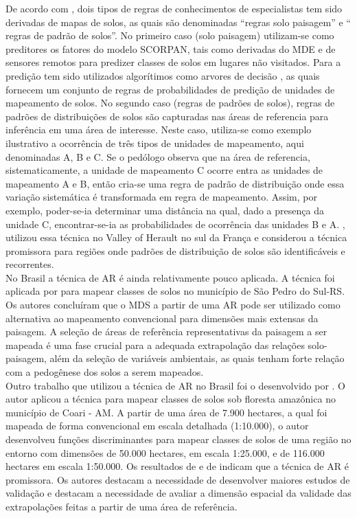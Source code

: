 De acordo com \cite{WalterEtAl:2007}, dois tipos de regras de conhecimentos de especialistas tem sido derivadas de mapas de solos, as quais são denominadas ``regras solo paisagem'' e `` regras de padrão de solos''. No primeiro caso (solo paisagem) utilizam-se como preditores os fatores do modelo SCORPAN, tais como derivadas do MDE e de sensores remotos para predizer classes de solos em lugares não visitados. Para a predição tem sido utilizados algorítimos como arvores de decisão \citep{Lagacherie:1992, LagacherieEtAl:1997, BuiEtAl:1999}, as quais fornecem um conjunto de regras de probabilidades de predição de unidades de mapeamento de solos.  No segundo caso (regras de padrões de solos), regras de padrões de distribuições de solos são capturadas nas áreas de referencia para inferência em uma área de interesse. Neste caso, utiliza-se como exemplo ilustrativo a ocorrência de três tipos de unidades de mapeamento, aqui denominadas A, B e C. Se o pedólogo observa
que na área de referencia, sistematicamente, a unidade de mapeamento C ocorre entra as unidades de mapeamento A e B, então cria-se uma regra de padrão de distribuição onde essa variação sistemática é transformada em regra de mapeamento. Assim, por exemplo, poder-se-ia determinar uma distância na qual, dado a presença da unidade C, encontrar-se-ia as probabilidades de ocorrência das unidades B e A. \cite{LagacherieEtAl:1995}, utilizou essa técnica no Valley of Herault no sul da França e considerou a técnica promissora para regiões onde padrões de distribuição de solos são identificáveis e recorrentes.\\
No Brasil a técnica de AR é ainda relativamente pouco aplicada. A técnica foi aplicada por \cite{TenCatenEtAl:2011} para mapear classes de solos no município de São Pedro do Sul-RS. Os autores concluíram que o MDS a partir de uma AR pode ser utilizado como alternativa ao mapeamento convencional para dimensões mais extensas da paisagem. A seleção de áreas de referência representativas da paisagem a ser mapeada é uma fase crucial para a adequada extrapolação das relações solo-paisagem, além da seleção de variáveis ambientais, as quais tenham forte relação com a pedogênese dos solos a serem mapeados.\\
Outro trabalho que utilizou a técnica de AR no Brasil foi o desenvolvido por \cite{Villela:2013}. O autor aplicou a técnica para mapear classes de solos sob floresta amazônica no município de Coari - AM. A partir de uma área de 7.900 hectares, a qual foi mapeada de forma convencional em escala detalhada (1:10.000), o autor desenvolveu funções discriminantes para mapear classes de solos de uma região no entorno com dimensões de 50.000 hectares, em escala 1:25.000, e de 116.000 hectares em escala 1:50.000. Os resultados de \cite{Villela:2013} e de \cite{TenCatenEtAl:2011} indicam que a técnica de AR é promissora. Os autores destacam a necessidade de desenvolver maiores estudos de validação e destacam a necessidade de avaliar a dimensão espacial da validade das extrapolações feitas a partir de uma área de referência.

